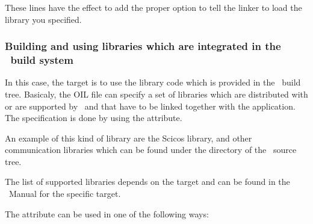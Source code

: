 These lines have the effect to add the proper option to tell the
linker to load the library you specified.

\subsubsection{Building and using libraries which are integrated in the \ee\ build system}

In this case, the target is to use the library code which is provided
in the \ee\ build tree. Basicaly, the OIL file can specify a set of
libraries which are distributed with or are supported by \ee\ and that
have to be linked together with the application. The specification is
done by using the  attribute.

An example of this kind of library are the Scicos library, and other
communication libraries which can be found under the 
directory of the \ee\ source tree.

The list of supported libraries depends on the target and
can be found in the \ee\ Manual for the specific target. 

The  attribute can be used in one of the following ways:

